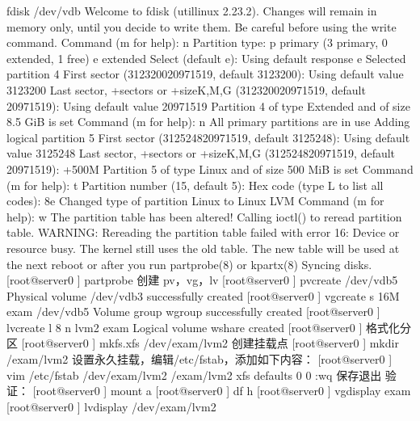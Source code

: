 \documentclass[letterpaper,10pt,english]{sphinxmanual}
\begin{document}
%
\begin{sphinxVerbatim}\PYGZsh{} fdisk /dev/vdb
Welcome to fdisk (util\PYGZhy{}linux 2.23.2).
Changes will remain in memory only, until you decide to write them. Be careful before using the write command.
Command (m for help): n
Partition type:
p   primary (3 primary, 0 extended, 1 free) e       extended
Select (default e):
Using default response e
Selected partition 4
First sector (3123200\PYGZhy{}20971519, default 3123200):
Using default value 3123200
Last sector, +sectors or +size\PYGZob{}K,M,G\PYGZcb{} (3123200\PYGZhy{}20971519, default 20971519):
Using default value 20971519
Partition 4 of type Extended and of size 8.5 GiB is set
Command (m for help): n
All primary partitions are in use
Adding logical partition 5
First sector (3125248\PYGZhy{}20971519, default 3125248):
Using default value 3125248
Last sector, +sectors or +size\PYGZob{}K,M,G\PYGZcb{} (3125248\PYGZhy{}20971519, default 20971519): +500M
Partition 5 of type Linux and of size 500 MiB is set
Command (m for help): t
Partition number (1\PYGZhy{}5, default 5):
Hex code (type L to list all codes): 8e
Changed type of partition \PYGZsq{}Linux\PYGZsq{} to \PYGZsq{}Linux LVM\PYGZsq{}
Command (m for help): w
The partition table has been altered!
Calling ioctl() to re\PYGZhy{}read partition table.
WARNING: Re\PYGZhy{}reading the partition table failed with error 16: Device or resource busy. The kernel still uses the old table. The new table will be used at the next reboot or after you run partprobe(8) or kpartx(8) Syncing disks.
[root@server0 \PYGZti{}]\PYGZsh{} partprobe
创建 pv，vg，lv
[root@server0 \PYGZti{}]\PYGZsh{} pvcreate /dev/vdb5
Physical volume \PYGZdq{}/dev/vdb3\PYGZdq{} successfully created
[root@server0 \PYGZti{}]\PYGZsh{} vgcreate \PYGZhy{}s 16M exam /dev/vdb5 Volume group \PYGZdq{}wgroup\PYGZdq{} successfully created
[root@server0 \PYGZti{}]\PYGZsh{} lvcreate \PYGZhy{}l 8 \PYGZhy{}n lvm2 exam
Logical volume \PYGZdq{}wshare\PYGZdq{} created
[root@server0 \PYGZti{}]\PYGZsh{}
格式化分区
[root@server0 \PYGZti{}]\PYGZsh{} mkfs.xfs  /dev/exam/lvm2
创建挂载点
[root@server0 \PYGZti{}]\PYGZsh{} mkdir /exam/lvm2
设置永久挂载，编辑/etc/fstab，添加如下内容：
[root@server0 \PYGZti{}]\PYGZsh{} vim /etc/fstab
/dev/exam/lvm2      /exam/lvm2      xfs     defaults        0 0
:wq 保存退出
验证：
[root@server0 \PYGZti{}]\PYGZsh{} mount \PYGZhy{}a
[root@server0 \PYGZti{}]\PYGZsh{} df \PYGZhy{}h
[root@server0 \PYGZti{}]\PYGZsh{} vgdisplay exam
[root@server0 \PYGZti{}]\PYGZsh{} lvdisplay /dev/exam/lvm2
\end{sphinxVerbatim}
\end{document}

